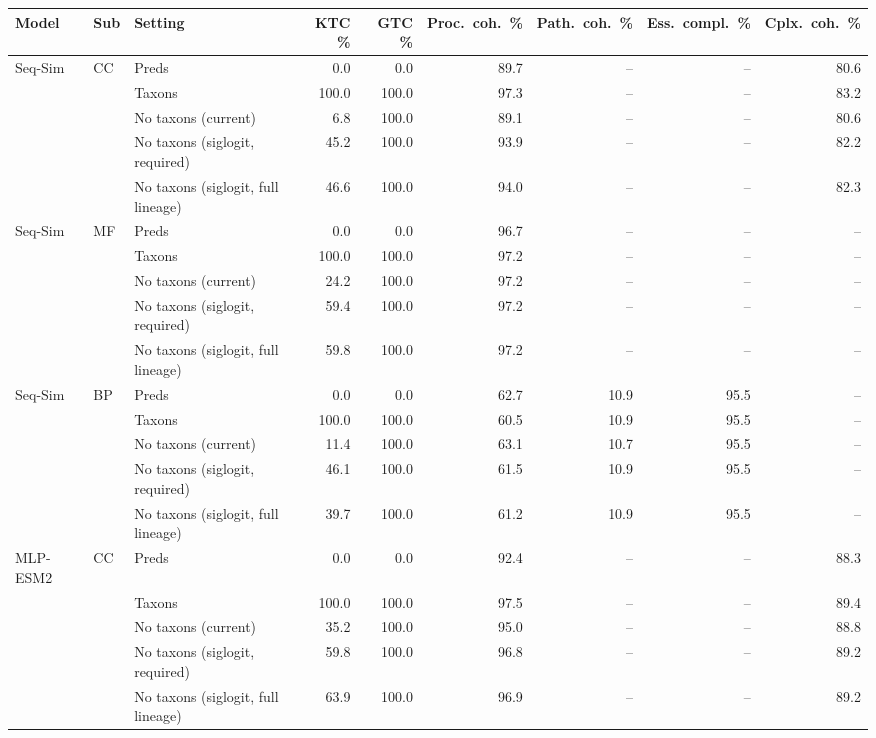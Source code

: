 \begin{tabular}{lllrrrrrr}
\toprule
Model & Sub & Setting & KTC \% & GTC \% & Proc.\ coh.\ \% & Path.\ coh.\ \% & Ess.\ compl.\ \% & Cplx.\ coh.\ \% \\
\midrule
Seq-Sim & CC & Preds & 0.0 & 0.0 & 89.7 & -- & -- & 80.6 \\
 &  & Taxons & 100.0 & 100.0 & 97.3 & -- & -- & 83.2 \\
 &  & No taxons (current) & 6.8 & 100.0 & 89.1 & -- & -- & 80.6 \\
 &  & No taxons (siglogit, required) & 45.2 & 100.0 & 93.9 & -- & -- & 82.2 \\
 &  & No taxons (siglogit, full lineage) & 46.6 & 100.0 & 94.0 & -- & -- & 82.3 \\
\addlinespace
Seq-Sim & MF & Preds & 0.0 & 0.0 & 96.7 & -- & -- & -- \\
 &  & Taxons & 100.0 & 100.0 & 97.2 & -- & -- & -- \\
 &  & No taxons (current) & 24.2 & 100.0 & 97.2 & -- & -- & -- \\
 &  & No taxons (siglogit, required) & 59.4 & 100.0 & 97.2 & -- & -- & -- \\
 &  & No taxons (siglogit, full lineage) & 59.8 & 100.0 & 97.2 & -- & -- & -- \\
\addlinespace
Seq-Sim & BP & Preds & 0.0 & 0.0 & 62.7 & 10.9 & 95.5 & -- \\
 &  & Taxons & 100.0 & 100.0 & 60.5 & 10.9 & 95.5 & -- \\
 &  & No taxons (current) & 11.4 & 100.0 & 63.1 & 10.7 & 95.5 & -- \\
 &  & No taxons (siglogit, required) & 46.1 & 100.0 & 61.5 & 10.9 & 95.5 & -- \\
 &  & No taxons (siglogit, full lineage) & 39.7 & 100.0 & 61.2 & 10.9 & 95.5 & -- \\
\midrule
MLP-ESM2 & CC & Preds & 0.0 & 0.0 & 92.4 & -- & -- & 88.3 \\
 &  & Taxons & 100.0 & 100.0 & 97.5 & -- & -- & 89.4 \\
 &  & No taxons (current) & 35.2 & 100.0 & 95.0 & -- & -- & 88.8 \\
 &  & No taxons (siglogit, required) & 59.8 & 100.0 & 96.8 & -- & -- & 89.2 \\
 &  & No taxons (siglogit, full lineage) & 63.9 & 100.0 & 96.9 & -- & -- & 89.2 \\

\end{tabular}
